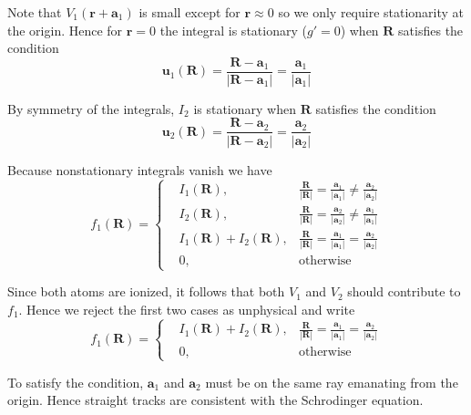 \documentclass[12pt]{article}
\begin{document}
Note that $V_1(\mathbf r+\mathbf a_1)$ is small except for $\mathbf r\approx0$ so
we only require stationarity at the origin.
Hence for $\mathbf r=0$ the integral is stationary ($g'=0$)
when $\mathbf R$ satisfies the condition
\begin{equation*}
\mathbf u_1(\mathbf R)
=\frac{\mathbf R-\mathbf a_1}{|\mathbf R-\mathbf a_1|}
=\frac{\mathbf a_1}{|\mathbf a_1|}
\end{equation*}

By symmetry of the integrals, $I_2$ is stationary when $\mathbf R$ satisfies the condition
\begin{equation*}
\mathbf u_2(\mathbf R)
=\frac{\mathbf R-\mathbf a_2}{|\mathbf R-\mathbf a_2|}
=\frac{\mathbf a_2}{|\mathbf a_2|}
\end{equation*}

Because nonstationary integrals vanish we have
\begin{equation*}
f_1(\mathbf R)=\left\{
\begin{aligned}
& I_1(\mathbf R),
& \frac{\mathbf R}{|\mathbf R|}=\frac{\mathbf a_1}{|\mathbf a_1|}\ne\frac{\mathbf a_2}{|\mathbf a_2|}
\\
& I_2(\mathbf R),
& \frac{\mathbf R}{|\mathbf R|}=\frac{\mathbf a_2}{|\mathbf a_2|}\ne\frac{\mathbf a_1}{|\mathbf a_1|}
\\
& I_1(\mathbf R)+I_2(\mathbf R),
& \frac{\mathbf R}{|\mathbf R|}=\frac{\mathbf a_1}{|\mathbf a_1|}=\frac{\mathbf a_2}{|\mathbf a_2|}
\\
& 0, & \text{otherwise}
\end{aligned}
\right.
\end{equation*}

Since both atoms are ionized, it follows that both $V_1$ and $V_2$ should contribute to $f_1$.
Hence we reject the first two cases as unphysical and write
\begin{equation*}
f_1(\mathbf R)=\left\{
\begin{aligned}
& I_1(\mathbf R)+I_2(\mathbf R),
& \frac{\mathbf R}{|\mathbf R|}=\frac{\mathbf a_1}{|\mathbf a_1|}=\frac{\mathbf a_2}{|\mathbf a_2|}
\\
& 0, & \text{otherwise}
\end{aligned}
\right.
\end{equation*}

To satisfy the condition, $\mathbf a_1$ and $\mathbf a_2$
must be on the same ray emanating from the origin.
Hence straight tracks are consistent with the Schrodinger equation.
\end{document}
